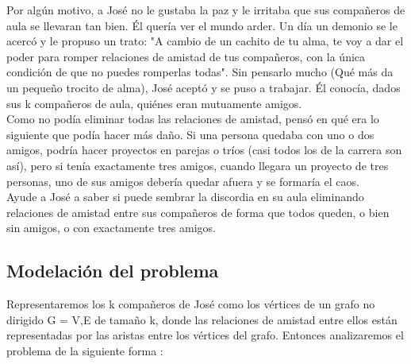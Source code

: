\documentclass[
10pt, %
a4paper, %
oneside, %
headinclude,footinclude, %
BCOR5mm, %
]{scrartcl}
\begin{document}
Por algún motivo, a José no le gustaba la paz y le irritaba que sus compañeros de aula se llevaran tan bien. Él quería ver
el mundo arder. Un día un demonio se le acercó y le propuso un trato: "A cambio de un cachito de tu alma, te voy a dar el poder para
romper relaciones de amistad de tus compañeros, con la única condición de que no puedes romperlas todas". Sin pensarlo mucho (Qué más
da un pequeño trocito de alma), José aceptó y se puso a trabajar. Él conocía, dados sus k compañeros de aula, quiénes eran mutuamente
amigos.\\

Como no podía eliminar todas las relaciones de amistad, pensó en qué era lo siguiente que podía hacer más daño. Si una persona quedaba con
uno o dos amigos, podría hacer proyectos en parejas o tríos (casi todos los de la carrera son así), pero si tenía exactamente tres amigos,
cuando llegara un proyecto de tres personas, uno de sus amigos debería quedar afuera y se formaría el caos. \\

Ayude a José a saber si puede sembrar la discordia en su aula eliminando relaciones de amistad entre sus compañeros de forma que todos queden, o bien sin amigos, o con exactamente tres amigos.







\subsection{Modelación del problema}

Representaremos los k compañeros de José como los vértices de un grafo no dirigido G = {V,E} de tamaño k, donde las relaciones de amistad entre ellos están representadas
por las aristas entre los vértices del grafo. Entonces analizaremos el problema de la siguiente forma :\\
\end{document}
